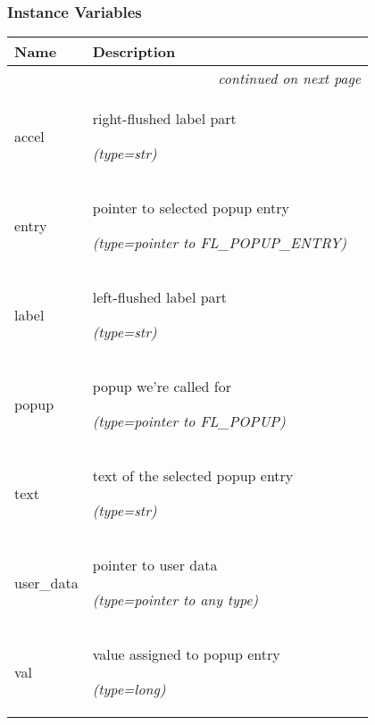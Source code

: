   \subsubsection{Instance Variables}

    \vspace{-1cm}
\hspace{\varindent}\begin{longtable}{|p{\varnamewidth}|p{\vardescrwidth}|l}
\cline{1-2}
\cline{1-2} \centering \textbf{Name} & \centering \textbf{Description}& \\
\cline{1-2}
\endhead\cline{1-2}\multicolumn{3}{r}{\small\textit{continued on next page}}\\\endfoot\cline{1-2}
\endlastfoot\raggedright a\-c\-c\-e\-l\- & \raggedright right-flushed label part

            {\it (type=str)}&\\
\cline{1-2}
\raggedright e\-n\-t\-r\-y\- & \raggedright pointer to selected popup entry

            {\it (type=pointer to FL\_POPUP\_ENTRY)}&\\
\cline{1-2}
\raggedright l\-a\-b\-e\-l\- & \raggedright left-flushed label part

            {\it (type=str)}&\\
\cline{1-2}
\raggedright p\-o\-p\-u\-p\- & \raggedright popup we're called for

            {\it (type=pointer to FL\_POPUP)}&\\
\cline{1-2}
\raggedright t\-e\-x\-t\- & \raggedright text of the selected popup entry

            {\it (type=str)}&\\
\cline{1-2}
\raggedright u\-s\-e\-r\-\_\-d\-a\-t\-a\- & \raggedright pointer to user data

            {\it (type=pointer to any type)}&\\
\cline{1-2}
\raggedright v\-a\-l\- & \raggedright value assigned to popup entry

            {\it (type=long)}&\\
\cline{1-2}
\end{longtable}



